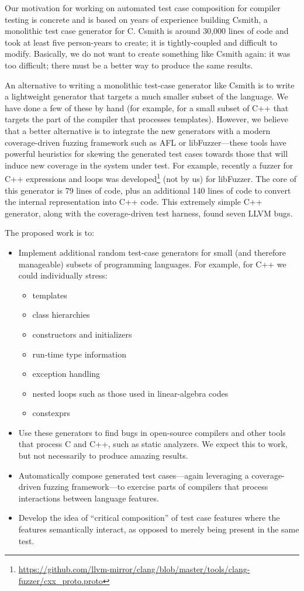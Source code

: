 Our motivation for working on automated test case composition for
 compiler testing is concrete and is based on years of experience
building Csmith, a monolithic test case generator for C\@.
%
Csmith is around 30,000 lines of code and took at least five
 person-years to create; it is tightly-coupled and difficult to
 modify.
%
Basically, we do not want to create something like Csmith again: it
 was too difficult; there must be a better way to produce the same
 results.


An alternative to writing a monolithic test-case generator like Csmith
 is to write a lightweight generator that targets a much smaller
 subset of the language.
%
We have done a few of these by hand (for example, for a small subset
 of C++ that targets the part of the compiler that processes
 templates).
%
However, we believe that a better alternative is to integrate the new
 generators with a modern coverage-driven fuzzing framework such as
 AFL\cite{aflfuzz} or libFuzzer\cite{libfuzzer}---these tools have
 powerful heuristics for skewing the generated test cases towards
 those that will induce new coverage in the system under test.
%
For example, recently a fuzzer for C++ expressions and loops was
 developed\footnote{\url{https://github.com/llvm-mirror/clang/blob/master/tools/clang-fuzzer/cxx_proto.proto}}
 (not by us) for libFuzzer.
%
The core of this generator is 79 lines of code, plus an additional 140
 lines of code to convert the internal representation into C++ code.
%
This extremely simple C++ generator, along with the coverage-driven
test harness, found seven LLVM bugs.


The proposed work is to:
\begin{itemize}
\item Implement additional random test-case generators for small
(and therefore manageable) subsets of programming languages. For example,
for C++ we could individually stress:
\begin{itemize}
\item templates
\item class hierarchies
\item constructors and initializers
\item run-time type information
\item exception handling
\item nested loops such as those used in linear-algebra codes
\item constexprs
\end{itemize}
\item Use these generators to find bugs in open-source compilers and
 other tools that process C and C++, such as static analyzers. We expect
this to work, but not necessarily to produce amazing results.
\item Automatically compose generated test cases---again leveraging a
 coverage-driven fuzzing framework---to exercise parts of compilers
 that process interactions between language features.
\item Develop the idea of ``critical composition'' of test case features
where the features semantically interact, as opposed to merely being
present in the same test.
\end{itemize}

